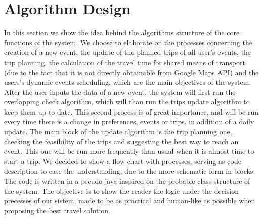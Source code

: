 %
%
\chapter{Algorithm Design}
%
\label{cap:algorithmdesign}
%
%
In this section we show the idea behind the algorithms structure of the core functions of the system. We choose to elaborate on the processes concerning the creation of a new event, the update of the planned trips of all user's events, the trip planning, the calculation of the travel time for shared means of transport (due to the fact that it is not directly obtainable from Google Maps API) and the users's dynamic events scheduling, which are the main objectives of the system. 
After the user inputs the data of a new event, the system will first run the overlapping check algorithm, which will than run the trips update algorithm to keep them up to date. This second process is of great importance, and will be run every time there is a change in preferences, events or trips, in addition of a daily update.  
The main block of the update algorithm is the trip planning one, checking the feasibility of the trips and suggesting the best way to reach an event. This one will be run more frequently than usual when it is almost time to start a trip. 
We decided to show a flow chart with processes, serving as code description to ease the understanding, due to the more schematic  form in blocks. The code is written in a pseudo java inspired on the probable class structure of the system.
The objective is to show the reader the logic under the decision precesses of our sistem, made to be as practical and human-like as possible when proposing the best travel solution.
\vspace{10mm}
%
